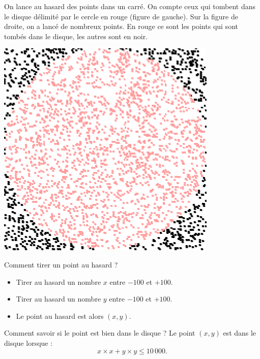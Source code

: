 \documentclass[class=report,crop=false, 12pt]{standalone}
\begin{document}
\begin{enigme}


On lance au hasard des points dans un carré. On compte ceux qui tombent dans le disque délimité par le cercle en rouge (figure de gauche). Sur la figure de droite, on a lancé de nombreux points. En rouge ce sont les points qui sont tombés dans le disque, les autres sont en noir.

\begin{center}
\begin{minipage}{0.49\textwidth}
\end{minipage}
\begin{minipage}{0.49\textwidth}
\includegraphics[scale=\scaleecran]{ecran-06-eg3bis} 
\end{minipage}
\end{center}

\bigskip

Comment tirer un point au hasard ?
\begin{itemize}
  \item Tirer au hasard un nombre $x$ entre $-100$ et $+100$.
  \item Tirer au hasard un nombre $y$ entre $-100$ et $+100$.
  \item Le point au hasard est alors $(x,y)$.
\end{itemize}

\bigskip

Comment savoir si le point est bien dans le disque ?
Le point $(x,y)$  est dans le disque lorsque :
$$x \times x + y \times y \le 10\,000.$$


\end{enigme}
\end{document}
